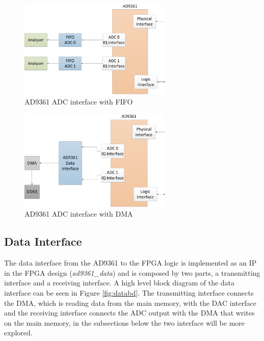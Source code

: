 \begin{figure}[htbp]
    \centering
    \includegraphics[width=0.65\textwidth]{./figures/adc_fifo}
    \caption{ AD9361 ADC interface with FIFO
    \label{fig:ad9361rxfifo}}
\end{figure}

\begin{figure}[htbp]
    \centering
    \includegraphics[width=0.65\textwidth]{./figures/adc_dma}
    \caption{ AD9361 ADC interface with DMA
    \label{fig:ad9361rxdma}}
\end{figure}


\subsection{Data Interface}
\label{subs:dataif}

The data interface from the AD9361 to the FPGA logic is implemented as an IP in
the FPGA design (\emph{ad9361\_data}) and is composed by two parts, a
transmitting interface and a receiving interface. A high level block diagram of
the data interface can be seen in Figure \ref{fig:databd}. The transmitting
interface connects the DMA, which is reading data from the main memory, with the
DAC interface and the receiving interface connects the ADC output with the DMA
that writes on the main memory, in the subsections below the two interface will
be more explored.

